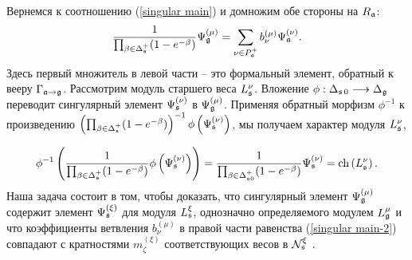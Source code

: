 Вернемся к соотношению  (\ref{singular main}) и домножим обе стороны на  $R_{\mathfrak{a}}$:
\begin{equation}
\frac{1}{\prod_{\beta \in \Delta _{\mathfrak{s}}^{+}}(1-e^{-\beta })}\Psi _{\mathfrak{g}}^{\left( \mu \right) }=\sum_{\nu \in P_{\mathfrak{a}}^{+}}b_{\nu}^{(\mu )}\Psi _{\mathfrak{a}}^{\left( \nu \right) }.
\label{singular main-2}
\end{equation}
Здесь первый множитель в левой части -- это формальный элемент, обратный к вееру $\Gamma _{\mathfrak{a}\rightarrow \mathfrak{g}}$. Рассмотрим модуль старшего веса $L_{\mathfrak{s}}^{\nu }$. Вложение $\phi :\Delta _{\mathfrak{s}\,0}\longrightarrow \Delta_{\mathfrak{g}}$ переводит сингулярный элемент  $\Psi _{\mathfrak{s}}^{\left( \nu\right) }$ в $\Psi _{\mathfrak{g}}^{\left( \mu \right) }$. Применяя обратный морфизм $\phi ^{-1}$ к произведению $\left( \prod_{\beta \in \Delta_{\mathfrak{s}}^{+}}(1-e^{-\beta })\right) ^{-1}\phi \left( \Psi _{\mathfrak{s}}^{\left( \nu \right) }\right) $, мы получаем характер модуля $L_{\mathfrak{s}}^{\nu }$,

\begin{equation}
\phi ^{-1}\left( \frac{1}{\prod_{\beta \in \Delta _{\sfr%
}^{+}}(1-e^{-\beta })}\phi \left( \Psi _{\sfr}^{\left( \nu \right)
}\right) \right) =\frac{1}{\prod_{\beta \in \Delta _{\sfr0
}^{+}}(1-e^{-\beta })}\Psi _{\sfr}^{\left( \nu \right) }=\mathrm{ch}%
\left( L_{\sfr}^{\nu }\right) .  \label{inverse for stem}
\end{equation}
Наша задача состоит в том, чтобы доказать, что сингулярный элемент $\Psi _{\mathfrak{g}}^{\left(\mu\right) }$ содержит элемент $\Psi _{\mathfrak{s}}^{\left( \xi \right) }$ для модуля $L_{\mathfrak{s}}^{\xi }$, однозначно определяемого модулем $L_{\mathfrak{g}}^{\mu }$ и что коэффициенты ветвления $b_{\nu }^{(\mu )}$ в правой части равенства (\ref{singular main-2}) совпадают с кратностями $m_{\zeta }^{\left( \xi\right) }$ соответствующих весов в $\mathcal{N}_{\mathfrak{s}}^{\xi }$ .

